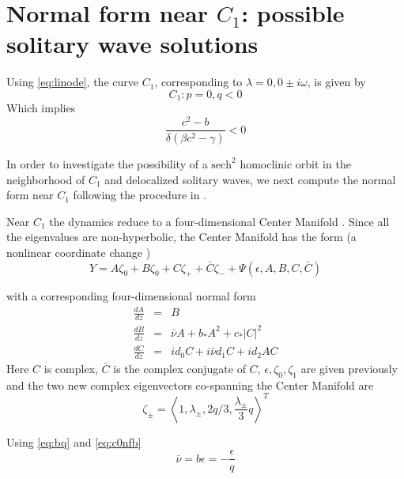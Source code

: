 \section{Normal form near $C_1$: possible solitary wave solutions}
Using \eqref{eq:linode}, the curve $C_1$, corresponding to $\lambda = 0, 0\pm i \omega$, is given by
\begin{equation}\label{eq:c1}
C_1 : { p = 0, q < 0 }
\end{equation}
Which implies
\begin{equation}
\frac{c^2 - b}{ \delta\left(\beta c^2 - \gamma \right)} < 0
\end{equation}

In order to investigate the possibility of a $ \mathrm{sech}^2 $  homoclinic orbit in
the neighborhood of $C_1$ and delocalized solitary waves, we next compute the
normal form near $C_1$ following the procedure in \cite{IA}.

Near $C_1$ the dynamics reduce to a four-dimensional Center Manifold \cite{IA}.
Since all the eigenvalues are non-hyperbolic, the Center Manifold has the form
(a nonlinear coordinate change \cite{IA})
\begin{equation} \label{eq:c1cm}
Y = A \zeta_0 + B \zeta_0 + C \zeta_+ + \bar{C} \zeta_- + \Psi(\epsilon,A,B,C,\bar{C})
\end{equation}

with  a corresponding four-dimensional normal form
\begin{subequations}\label{eq:c1nf}
\begin{eqnarray}
\frac{dA}{dz} &=& B \label{eq:aq} \\
\frac{dB}{dz} &=& \bar{\nu} A + b_* A^2 + c_* \left|C\right|^2  \label{eq:bq} \\
\frac{dC}{dz} &=& i d_0 C + i \bar{\nu} d_1 C + i d_2 A C \label{eq:cq}
\end{eqnarray}
\end{subequations}
Here $C$ is complex, $\bar{C}$ is the complex conjugate of $C$, $\epsilon,
\zeta_0, \zeta_1$ are given previously and the two new complex eigenvectors
co-spanning the Center Manifold are
\begin{equation}
\zeta_\pm	 = \left< 1, \lambda_\pm, 2 q / 3, \frac{\lambda_\pm}{3} q\right>^T 
\end{equation}

Using \eqref{eq:bq} and \eqref{eq:c0nfb}
\begin{equation}
\bar{\nu} = b \epsilon = -\frac{\epsilon}{q} 
\end{equation}

